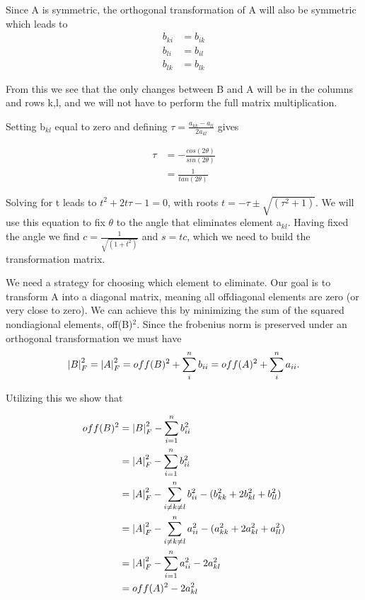 Since A is symmetric, the orthogonal transformation of A will also be symmetric
which leads to
\begin{align*}
  b_{ki} &= b_{ik} \\
  b_{li} &= b_{il} \\
  b_{lk} &= b_{lk}
\end{align*}

From this we see that the only changes between B and A will be in the columns
and rows k,l, and we will not have to perform the full matrix multiplication.

Setting b$_{kl}$ equal to zero and defining $\tau = \frac{a_{kk} - a_{ll}}{2a_{kl}}$
gives

\begin{align*}
  \tau &= -\frac{cos(2\theta)}{sin(2\theta)} \\
  &=  \frac{1}{tan(2\theta)}
\end{align*}

Solving for t leads to $t^2 + 2t\tau -1 = 0$, with roots $t = -\tau \pm \sqrt{(\tau^2 + 1)}$. We will
use this equation to fix $\theta$ to the angle that eliminates element a$_{kl}$.
Having fixed the angle we find $c = \frac{1}{\sqrt{(1+t^2)}}$ and $s = tc$, which
we need to build the transformation matrix.

We need a strategy for choosing which element to eliminate. Our goal is to
transform A into a diagonal matrix, meaning all offdiagonal elements are zero
(or very close to zero). We can achieve this by minimizing the sum of the
squared nondiagional elements, off(B)$^2$. Since the frobenius norm is
preserved under an orthogonal transformation we must have
$$ \abs{B}_F^2 = \abs{A}_F^2 =  off(B)^2 + \sum_{i}^{n} b_{ii} = off(A)^2 + \sum_{i}^{n} a_{ii}.$$

Utilizing this we show that

\begin{align*}
  off(B)^2 &= \abs{B}_F^2 - \sum_{i=1}^{n} b_{ii}^2 \\
  &= \abs{A}_F^2 - \sum_{i=1}^{n} b_{ii}^2 \\
  &= \abs{A}_F^2 - \sum_{i \neq k \neq l}^{n} b_{ii}^2 - (b_{kk}^2 + 2b_{kl}^2 + b_{ll}^2) \\
  &= \abs{A}_F^2 - \sum_{i\neq k \neq l}^{n} a_{ii}^2 - (a_{kk}^2 + 2a_{kl}^2 + a_{ll}^2) \\
  &= \abs{A}_F^2 - \sum_{i=1}^{n} a_{ii}^2 - 2a_{kl}^2 \\
  &= off(A)^2 - 2a_{kl}^2
\end{align*}

